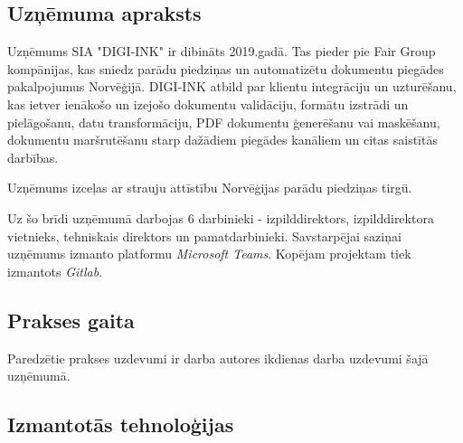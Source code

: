 
\subsection{Uzņēmuma apraksts}
Uzņēmums SIA "DIGI-INK" ir dibināts 2019.gadā. Tas pieder pie Fair Group kompānijas, kas sniedz parādu piedziņas un automatizētu dokumentu piegādes pakalpojumus Norvēģijā.
DIGI-INK atbild par klientu integrāciju un uzturēšanu, kas ietver ienākošo un izejošo dokumentu validāciju, formātu izstrādi un pielāgošanu, datu transformāciju, PDF dokumentu ģenerēšanu vai maskēšanu, dokumentu maršrutēšanu starp dažādiem piegādes kanāliem un citas saistītās darbības.
\par Uzņēmums izceļas ar strauju attīstību Norvēģijas parādu piedziņas tirgū. %
\par Uz šo brīdi uzņēmumā darbojas 6 darbinieki - izpilddirektors, izpilddirektora vietnieks, tehniskais direktors un pamatdarbinieki. Savstarpējai saziņai uzņēmums izmanto platformu \textit{Microsoft Teams}. Kopējam projektam tiek izmantots \textit{Gitlab}.

\subsection{Prakses gaita}
Paredzētie prakses uzdevumi ir darba autores ikdienas darba uzdevumi šajā uzņēmumā.

\subsection{Izmantotās tehnoloģijas}


